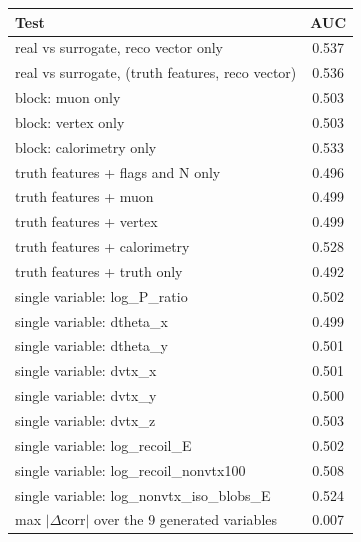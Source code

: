 \begin{tabular}{lc}
\toprule
Test & AUC \\
\midrule
real vs surrogate, reco vector only & 0.537 \\
real vs surrogate, (truth features, reco vector) & 0.536 \\
\midrule
block: muon only & 0.503 \\
block: vertex only & 0.503 \\
block: calorimetry only & 0.533 \\
truth features + flags and N only & 0.496 \\
truth features + muon & 0.499 \\
truth features + vertex & 0.499 \\
truth features + calorimetry & 0.528 \\
truth features + truth only & 0.492 \\
single variable: log\_P\_ratio & 0.502 \\
single variable: dtheta\_x & 0.499 \\
single variable: dtheta\_y & 0.501 \\
single variable: dvtx\_x & 0.501 \\
single variable: dvtx\_y & 0.500 \\
single variable: dvtx\_z & 0.503 \\
single variable: log\_recoil\_E & 0.502 \\
single variable: log\_recoil\_nonvtx100 & 0.508 \\
single variable: log\_nonvtx\_iso\_blobs\_E & 0.524 \\
\midrule
max $|\Delta$corr$|$ over the 9 generated variables & 0.007 \\
\bottomrule
\end{tabular}
